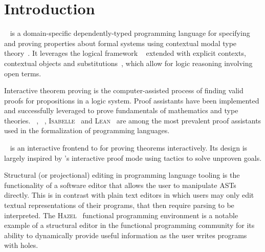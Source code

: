 \chapter{Introduction}





\Beluga~\cite{pientka2010beluga} is a domain-specific dependently-typed programming language for specifying and proving properties about formal systems using contextual modal type theory~\cite{nanevski2008contextual}.
It leverages the logical framework \LF~\cite{harper1993framework} extended with explicit contexts, contextual objects and substitutions~\cite{DBLP:journals/corr/abs-1009-2789, cave2013first}, which allow for logic reasoning involving open terms.


Interactive theorem proving is the computer-assisted process of finding valid proofs for propositions in a logic system.
Proof assistants have been implemented and successfully leveraged to prove fundamentals of mathematics and type theories.
\Agda~\cite{10.1007/11559306_17}, \Coq~\cite{Coq, bertot2013interactive}, \textsc{Isabelle}~\cite{nipkow2002isabelle} and \textsc{Lean}~\cite{10.1007/978-3-030-79876-5_37} are among the most prevalent proof assistants used in the formalization of programming languages.

\Harpoon~\cite{errington2021harpoon} is an interactive frontend to \Beluga for proving theorems interactively.
Its design is largely inspired by \Coq's interactive proof mode using tactics to solve unproven goals.

Structural (or projectional) editing in programming language tooling is the functionality of a software editor that allows the user to manipulate \acp{AST} directly.
This is in contrast with plain text editors in which users may only edit textual representations of their programs, that then require parsing to be interpreted.
The \textsc{Hazel}~\cite{omar2017hazelnut, omar2019live} functional programming environment is a notable example of a structural editor in the functional programming community for its ability to dynamically provide useful information as the user writes programs with holes.


